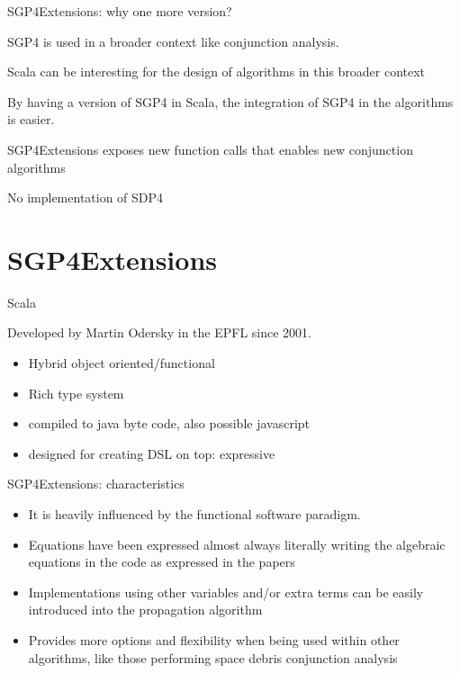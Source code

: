 \documentclass[10pt, compress, xcolor={usenames,dvipsnames}]{beamer}
\newcommand{\SmallArrow}{\ding{228}}
\begin{document}
\begin{frame}[fragile]{SGP4Extensions: why one more version?}

SGP4 is used in a broader context like conjunction analysis.

Scala can be interesting for the design of algorithms in this broader context

By having a version of SGP4 in Scala, the integration of SGP4 in the algorithms is easier.

SGP4Extensions exposes new function calls that enables new conjunction algorithms

No implementation of SDP4

\end{frame}

\section{SGP4Extensions}

\begin{frame}[fragile]{Scala}

Developed by Martin Odersky in the EPFL since 2001.

  \begin{itemize}[label=\SmallArrow]
    \item Hybrid object oriented/functional
    \item Rich type system
    \item compiled to java byte code, also possible javascript
    \item designed for creating DSL on top: expressive
  \end{itemize}

\end{frame}

\begin{frame}[fragile]{SGP4Extensions: characteristics}

  \begin{itemize}[label=\SmallArrow]
  \item  It is heavily influenced by the functional software paradigm.
  \item  Equations have been expressed almost always literally writing the algebraic equations in the code as expressed in the papers
  \item  Implementations using other variables and/or extra terms can be easily introduced into the propagation algorithm
  \item  Provides more options and flexibility when being used within other algorithms, like those performing space debris conjunction analysis

  \end{itemize}

\end{frame}
\end{document}
